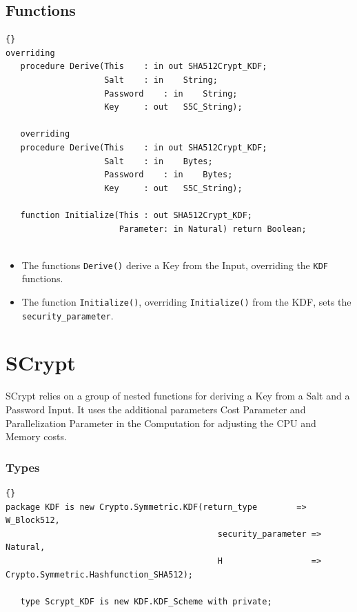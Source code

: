\subsection*{Functions}
\begin{lstlisting}{}
overriding
   procedure Derive(This	: in out SHA512Crypt_KDF;
                    Salt	: in 	String;
                    Password	: in	String;
                    Key		: out	S5C_String);

   overriding
   procedure Derive(This	: in out SHA512Crypt_KDF;
                    Salt	: in 	Bytes;
                    Password	: in	Bytes;
                    Key		: out	S5C_String);

   function Initialize(This	: out SHA512Crypt_KDF;
                       Parameter: in Natural) return Boolean;


\end{lstlisting}
\begin{itemize}
	\item The functions \texttt{Derive()} derive a Key from the Input, overriding the \texttt{KDF} functions.
	\item The function \texttt{Initialize()}, overriding \texttt{Initialize()} from the KDF, sets the \texttt{security\_parameter}.
\end{itemize}


\section{SCrypt}
SCrypt relies on a group of nested functions for deriving a Key from a Salt and a Password Input. It uses the additional parameters Cost Parameter and Parallelization Parameter in the Computation for adjusting the CPU and Memory costs.
\subsubsection*{Types}
\begin{lstlisting}{}
package KDF is new Crypto.Symmetric.KDF(return_type        => W_Block512,
                                           security_parameter => Natural,
                                           H                  => Crypto.Symmetric.Hashfunction_SHA512);

   type Scrypt_KDF is new KDF.KDF_Scheme with private;


\end{lstlisting}

